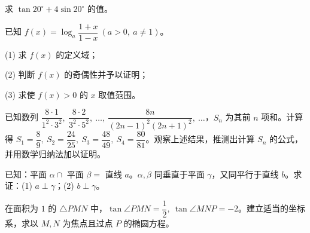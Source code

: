\begin{question}
求 $\tan20^\circ+4\sin20^\circ$ 的值。

\end{question}
\begin{question}
已知 $f(x)=\log_a\dfrac{1+x}{1-x}\ (a>0,\ a\ne1)$。

(1) 求 $f(x)$ 的定义域；

(2) 判断 $f(x)$ 的奇偶性并予以证明；

(3) 求使 $f(x)>0$ 的 $x$ 取值范围。

\end{question}
\begin{question}
已知数列 $\dfrac{8\cdot1}{1^2\cdot3^2},\ \dfrac{8\cdot2}{3^2\cdot5^2},\ \ldots,\ \dfrac{8n}{(2n-1)^2(2n+1)^2},\ \ldots$，$S_n$ 为其前 $n$ 项和。计算得 $S_1=\dfrac89,\ S_2=\dfrac{24}{25},\ S_3=\dfrac{48}{49},\ S_4=\dfrac{80}{81}$。观察上述结果，推测出计算 $S_n$ 的公式，并用数学归纳法加以证明。

\end{question}
\begin{question}
已知：平面 $\alpha\cap$ 平面 $\beta=$ 直线 $a$。$\alpha,\beta$ 同垂直于平面 $\gamma$，又同平行于直线 $b$。求证：(1) $a\perp\gamma$；(2) $b\perp\gamma$。

\end{question}
\begin{question}
在面积为 $1$ 的 $\triangle PMN$ 中，$\tan\angle PMN=\dfrac12,\ \tan\angle MNP=-2$。建立适当的坐标系，求以 $M,N$ 为焦点且过点 $P$ 的椭圆方程。

\end{question}